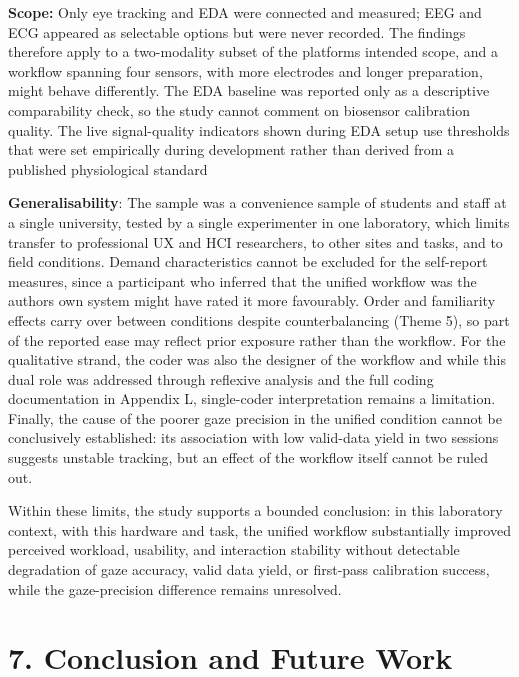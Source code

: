 \documentclass[
]{article}
\begin{document}
\textbf{Scope:} Only eye tracking and EDA were connected and measured; EEG and ECG appeared as selectable options but were never recorded. The findings therefore apply to a two-modality subset of the platform\textquotesingle s intended scope, and a workflow spanning four sensors, with more electrodes and longer preparation, might behave differently. The EDA baseline was reported only as a descriptive comparability check, so the study cannot comment on biosensor calibration quality. The live signal-quality indicators shown during EDA setup use thresholds that were set empirically during development rather than derived from a published physiological standard

\textbf{Generalisability}: The sample was a convenience sample of students and staff at a single university, tested by a single experimenter in one laboratory, which limits transfer to professional UX and HCI researchers, to other sites and tasks, and to field conditions. Demand characteristics cannot be excluded for the self-report measures, since a participant who inferred that the unified workflow was the author\textquotesingle s own system might have rated it more favourably. Order and familiarity effects carry over between conditions despite counterbalancing (Theme 5), so part of the reported ease may reflect prior exposure rather than the workflow. For the qualitative strand, the coder was also the designer of the workflow and while this dual role was addressed through reflexive analysis and the full coding documentation in Appendix L, single-coder interpretation remains a limitation. Finally, the cause of the poorer gaze precision in the unified condition cannot be conclusively established: its association with low valid-data yield in two sessions suggests unstable tracking, but an effect of the workflow itself cannot be ruled out.

Within these limits, the study supports a bounded conclusion: in this laboratory context, with this hardware and task, the unified workflow substantially improved perceived workload, usability, and interaction stability without detectable degradation of gaze accuracy, valid data yield, or first-pass calibration success, while the gaze-precision difference remains unresolved.

\clearpage
\hypertarget{conclusion-and-future-work}{%
\section{7. Conclusion and Future Work}\label{conclusion-and-future-work}}
\end{document}
